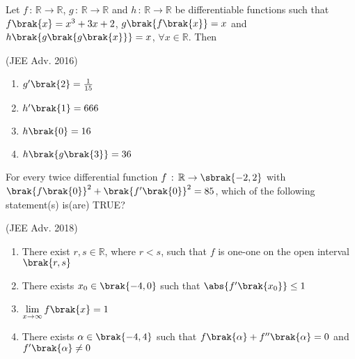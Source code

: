 \iffalse
  \title{Assignment}
  \author{AI24BTECH11022 - Pabbuleti Venkata Charan Teja}
  \section{mcq-multiple}
\fi


\item
Let $f\,:\,\mathbb{R}\to\mathbb{R}$, $g\,:\,\mathbb{R}\to\mathbb{R}$ and $h\,:\,\mathbb{R}\to\mathbb{R}$ be differentiable functions such that ${f\brak{x}=x^{3}+3x+2}$, $g\brak{f\brak{x}}=x$ and $h\brak{g\brak{g\brak{x}}}=x$, $\forall x\in\mathbb{R}$. Then 

\hfill{(JEE Adv. 2016)}

\begin{multicols}{2}
\begin{enumerate}

\item$g^{\prime}\brak{2}=\frac{1}{15}$
\item$h^{\prime}\brak{1}=666$
\item$h\brak{0}=16$
\item$h\brak{g\brak{3}}=36$ 

\end{enumerate}
\end{multicols}

\item 
For every twice differential function ${f\,:\,\mathbb{R}\to\sbrak{-2,2}}$ with $\brak{f\brak{0}}^{2}+\brak{f^{\prime}\brak{0}}^{2}=85$, which of the following statement(s) is(are) TRUE?

\hfill{(JEE Adv. 2018)}

\begin{enumerate}
\item There exist $r,s\in\mathbb{R}$, where $r<s$, such that $f$ is one-one on the open interval $\brak{r,s}$

\item There  exists $x_{0}\in\brak{-4,0}$ such that $\abs{f^{\prime}\brak{x_{0}}}\leq1$

\item $\lim \limits_{x\to\infty}f\brak{x}=1$

\item There exists $\alpha\in\brak{-4,4}$ such that ${f\brak{\alpha}+f^{\prime\prime}\brak{\alpha}=0}$ and ${f^{\prime}\brak{\alpha}\not=0}$
\end{enumerate}

